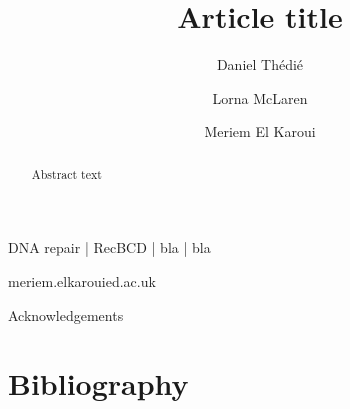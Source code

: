 \documentclass[times, twoside]{zHenriquesLab-StyleBioRxiv}
\begin{document}
\title{Article title}
\shorttitle{}

\author[1]{Daniel Thédié}
\author[1]{Lorna McLaren}
\author[1]{Meriem El Karoui}



\maketitle

\begin{abstract}
Abstract text
\end {abstract}

\begin{keywords}
DNA repair | RecBCD | bla | bla
\end{keywords}

\begin{corrauthor}
meriem.elkaroui\at ed.ac.uk
\end{corrauthor}













\begin{acknowledgements}
Acknowledgements
\end{acknowledgements}

\section*{Bibliography}


\onecolumn
\newpage


\end{document}
